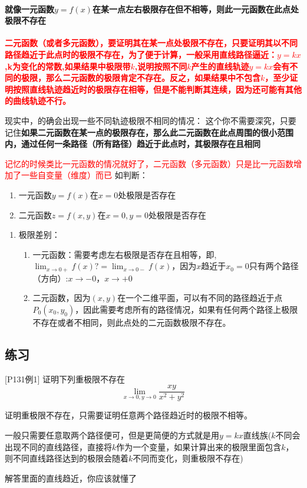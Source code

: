 \documentclass[a4paper]{ctexart}
\begin{document}
\begin{multicols}{2}
\paragraph{就像一元函数$y=f(x)$在某一点左右极限存在但不相等，则此一元函数在此点处极限不存在}
\par
{\textbf{\textcolor{red}{二元函数（或者多元函数），要证明其在某一点处极限不存在，只要证明其以不同路径趋近于此点时的极限不存在，为了便于计算，一般采用直线路径逼近：$y=kx$,k为变化的常数,如果结果中极限带$k$,说明按照不同$k$产生的直线轨迹$y=kx$会有不同的极限，那么二元函数的极限肯定不存在。反之，如果结果中不包含$k$，至少证明按照\textbf{直线轨迹}趋近时的极限存在相等，但是不能判断其连续，因为还可能有其他的曲线轨迹不行。}}}
\par
现实中，的确会出现一些不同轨迹极限不相同的情况：
这个你不需要深究，只要记住\textbf{如果二元函数在某一点的极限存在，那么此二元函数在此点周围的很小范围内，通过任何一条路径（所有路径）趋近于此点时，其极限存在且相同}
\par
\textcolor{red}{记忆的时候类比一元函数的情况就好了，二元函数（多元函数）只是比一元函数增加了一些自变量（维度）而已}
如判断：
\begin{enumerate}
    \item 一元函数$y=f(x)$在$x=0$处极限是否存在
    \item 二元函数$z=f(x,y)$在$x=0,y=0$处极限是否存在
\end{enumerate}
\begin{enumerate}
    \item 极限差别：
        \begin{enumerate}
            \item 一元函数：需要考虑左右极限是否存在且相等，即,$\lim_{x\rightarrow 0+}{f(x)}?=\lim_{x\rightarrow 0-}{f(x)}$，因为$x$趋近于$x_0=0$只有两个路径（方向）:$x\rightarrow -0$，$x\rightarrow +0$
            \item 二元函数，因为$(x,y)$在一个二维平面，可以有不同的路径趋近于点$P_0(x_0,y_0)$，因此需要考虑所有的路径情况，如果有任何两个路径上极限不存在或者不相同，则此点处的二元函数极限不存在。
        \end{enumerate}
\end{enumerate}

\subsection{练习}
[P131例1]
证明下列重极限不存在
$$
\lim_{x\rightarrow 0, y\rightarrow 0}
{
    \frac{xy}{x^2 + y^2}
}
$$
\par
证明重极限不存在，只需要证明任意两个路径趋近时的极限不相等。 
\par
一般只需要任意取两个路径便可，但是更简便的方式就是用$y=kx$直线族($k$不同会出现不同的直线路径，直接将$k$作为一个变量，如果计算出来的极限里面包含$k$，则不同直线路径达到的极限会随着$k$不同而变化，则重极限不存在)
\par
解答里面的直线趋近，你应该就懂了





\end{multicols}
\end{document}
